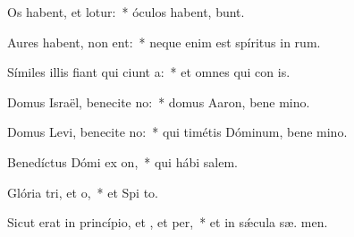 \item Os habent, et  lotur:~* óculos habent,   bunt.
\item Aures habent,  non ent:~* neque enim est spíritus in  rum.
\item Símiles illis fiant qui ciunt a:~* et omnes qui con  is.
\item Domus Israël, benecite no:~* domus Aaron, bene mino.
\item Domus Levi, benecite no:~* qui timétis Dóminum, bene mino.
\item Benedíctus Dómi ex on,~* qui hábi  salem.
\item Glória tri, et o,~* et Spi to.
\item Sicut erat in princípio, et , et per,~* et in sǽcula sæ. men.

